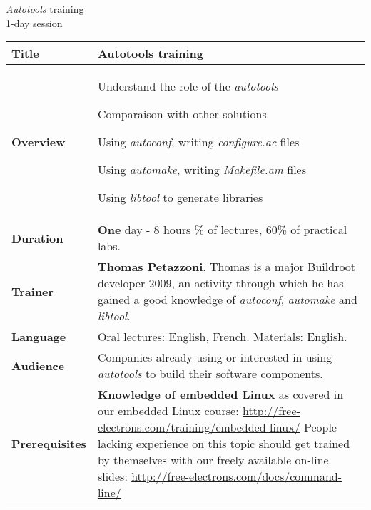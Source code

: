 \documentclass[a4paper,12pt,obeyspaces,spaces,hyphens]{article}
\begin{document}
\thispagestyle{fancy}

\setlength{\arrayrulewidth}{0.8pt}

\begin{center}
\LARGE
{\em Autotools} training\\
\large
1-day session
\end{center}
\vspace{1cm}

\small
{}

 {
  \begin{tabularx}{\textwidth}{|g|h|}
    {\bf Title} & {\bf Autotools training} \\
    \hline

    {\bf Overview} &
    Understand the role of the {\em autotools} \par
    Comparaison with other solutions \par
    Using {\em autoconf}, writing {\em configure.ac} files \par
    Using {\em automake}, writing {\em Makefile.am} files \par
    Using {\em libtool} to generate libraries \\
    \hline

    {\bf Duration} & {\bf One} day - 8 hours
    \% of lectures, 60\% of practical labs. \\
    \hline

    {\bf Trainer} & {\bf Thomas Petazzoni}. Thomas is a major
    Buildroot developer 2009, an activity through which he has gained
    a good knowledge of {\em autoconf}, {\em automake} and {\em
      libtool}.\\
    \hline

    {\bf Language} & Oral lectures: English, French.
    \newline Materials: English.\\
    \hline

    {\bf Audience} & Companies already using or interested in using
    {\em autotools} to build their software components.\\
    \hline

    {\bf Prerequisites} & {\bf Knowledge of embedded Linux} as covered
    in our embedded Linux course:
    \newline \url{http://free-electrons.com/training/embedded-linux/} \vspace{1em}
    \newline People lacking experience on this topic should get
    trained by themselves with our freely available on-line slides:
    \newline \url{http://free-electrons.com/docs/command-line/} \\
    \hline
  \end{tabularx}

}
\end{document}
